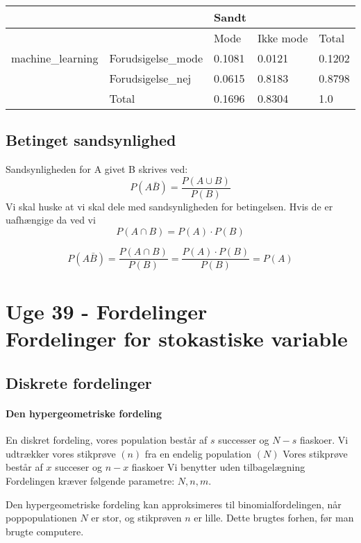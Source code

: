 \documentclass{article}
\begin{document}
\begin{table}[H]
  \centering
  \begin{tabular}{l|l|l|l|l}
   &                    & Sandt  &           &        \\\hline
   &                                       & Mode   & Ikke mode & Total  \\\hline
   machine\_learning & Forudsigelse\_mode & 0.1081 & 0.0121    & 0.1202 \\\hline
   & Forudsigelse\_nej  & 0.0615 & 0.8183    & 0.8798 \\\hline
   & Total              & 0.1696 & 0.8304    & 1.0   
  \end{tabular}
\end{table}

\subsection{Betinget sandsynlighed}
Sandsynligheden for A givet B skrives ved:
$$P (A \bar B) = \frac{P( A \cup B)}{P(B)}$$ Vi skal huske at vi skal dele med
sandsynligheden for betingelsen. Hvis de er uafhængige da ved vi
$$P(A \cap B) = P(A) \cdot P(B) $$

$$P(A \bar B) = \frac{P(A\cap B)}{P(B)} = \frac{P(A) \cdot P(B)}{P(B)} = P(A)$$

\newpage
\section{Uge 39 - Fordelinger \\ Fordelinger for stokastiske variable} 

\subsection{Diskrete fordelinger}
\paragraph{Den hypergeometriske fordeling}
En diskret fordeling, vores population består af $s$ successer og $N-s$
fiaskoer. Vi udtrækker vores stikprøve $(n)$ fra en endelig population $(N)$
Vores stikprøve består af $x$ succeser og $n-x$ fiaskoer Vi benytter uden
tilbagelægning Fordelingen kræver følgende parametre: $N, n, m$.


Den hypergeometriske fordeling kan approksimeres til binomialfordelingen, når
poppopulationen $N$ er stor, og stikprøven $n$ er lille. Dette brugtes forhen,
før man brugte computere.
\end{document}
